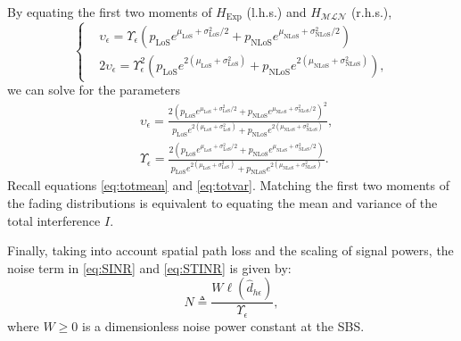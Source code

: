 \documentclass[lettersize,journal]{IEEEtran}
\begin{document}
By equating the first two moments of $H_{\text{Exp}}$ (l.h.s.) and $H_{\mathcal{M} \mathcal{L}\mathcal{N}}$ (r.h.s.),
\begin{equation}
  \label{eq:matchingmoments}
  \begin{cases}
    &\upsilon_{\epsilon} = \Upsilon_{\epsilon} \left(p_{\text{LoS}} e^{\mu_{\text{LoS}} + \sigma_{\text{LoS}}^2/2} + p_{\text{NLoS}} e^{\mu_{\text{NLoS}} + \sigma_{\text{NLoS}}^2/2}\right)\\
    &2\upsilon_{\epsilon}= \Upsilon_{\epsilon}^2 \left( p_{\text{LoS}} e^{2(\mu_{\text{LoS}} + \sigma_{\text{LoS}}^2)} + p_{\text{NLoS}} e^{2(\mu_{\text{NLoS}} + \sigma_{\text{NLoS}}^2)} \right), 
  \end{cases}
\end{equation}
we can solve for the parameters
\begin{align}
  \label{eq:epsilonandupsilon}
  & \upsilon_{\epsilon}= \frac{ 2\left( p_{\text{LoS}}e^{\mu_{\text{LoS}}+\sigma^2_{\text{LoS}}/2}+p_{\text{NLoS}}e^{\mu_{\text{NLoS}}+\sigma^2_{\text{NLoS}}/2} \right)^2}{p_{\text{LoS}}e^{2(\mu_{\text{LoS}}+\sigma_{\text{LoS}}^2)}+p_{\text{NLoS}}e^{2(\mu_{\text{NLoS}}+\sigma_{\text{NLoS}}^2)}}, \\ 
    &\Upsilon_{\epsilon} = \frac{2\left(p_{\text{LoS}}e^{\mu_{\text{LoS}}+\sigma^2_{\text{LoS}}/2}+p_{\text{NLoS}}e^{\mu_{\text{NLoS}}+\sigma^2_{\text{NLoS}}/2}\right)}{p_{\text{LoS}}e^{2(\mu_{\text{LoS}}+\sigma_{\text{LoS}}^2)}+p_{\text{NLoS}}e^{2(\mu_{\text{NLoS}}+\sigma_{\text{NLoS}}^2)}}.
\end{align}
Recall equations \eqref{eq:totmean} and \eqref{eq:totvar}. Matching the first two moments of the fading distributions is equivalent to equating the mean and variance of the total interference $I$.



Finally, taking into account spatial path loss and the scaling of signal powers, the noise term in \eqref{eq:SINR} and \eqref{eq:STINR} is given by:
\begin{equation}
N \triangleq \frac{W \ell(\hat{d}_{h\epsilon})}{\Upsilon_{\epsilon}},
\end{equation}
where $W \geq 0$ is a dimensionless noise power constant at the SBS.
\end{document}
